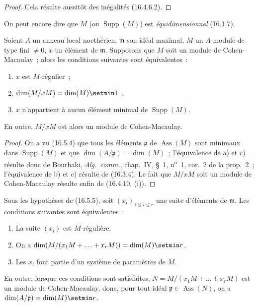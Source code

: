 \begin{proof}
Cela résulte aussitôt des inégalités (16.4.6.2).
\end{proof}

On peut encore dire que $M$ (ou $\operatorname{Supp}(M)$) est
\emph{équidimensionnel} (16.1.7).


\begin{proposition}[16.5.5]
\label{0.16.5.5-fr}
Soient $A$ un anneau local noethérien, $\mathfrak{m}$ son idéal maximal, $M$
un $A$-module de type fini $\neq0$, $x$ un élément de $\mathfrak{m}$.
Supposons que $M$ soit un module de Cohen-Macaulay~; alors les conditions
suivantes sont équivalentes~:
\begin{enumerate}
  \item[\textup{a)}] $x$ est $M$-régulier~;
  \item[\textup{b)}] $\dim(M/xM)=\dim(M)\setmin 1$~;
  \item[\textup{c)}] $x$ n'appartient à aucun élément minimal de
  $\operatorname{Supp}(M)$.
\end{enumerate}
En outre, $M/xM$ est alors un module de Cohen-Macaulay.
\end{proposition}

\begin{proof}
On a vu (16.5.4) que tous les éléments $\mathfrak{p}$ de
$\operatorname{Ass}(M)$ sont minimaux dans $\operatorname{Supp}(M)$ et que
$\dim(A/\mathfrak{p})=\dim(M)$~; l'équivalence de a) et c) résulte donc de
Bourbaki, \emph{Alg.~comm.}, chap.~IV, \S~1, n\textsuperscript{o}~1, cor.~2 de la prop.~2~;
l'équivalence de b) et c) résulte de (16.3.4). Le fait que $M/xM$ soit un
module de Cohen-Macaulay résulte enfin de (16.4.10, (i)).
\end{proof}

\begin{corollary}[16.5.6]
\label{0.16.5.6-fr}
Sous les hypothèses de \textup{(16.5.5)}, soit $(x_i)_{1\leq i\leq r}$ une suite
d'éléments de $\mathfrak{m}$. Les conditions suivantes sont équivalentes~:
\begin{enumerate}
  \item[\textup{a)}] La suite $(x_i)$ est $M$-régulière.
  \item[\textup{b)}] On a
  $\dim(M/(x_1M+\ldots+x_rM))=\dim(M)\setmin r$.
  \item[\textup{c)}] Les $x_i$ font partie d'un système de paramètres de $M$.
\end{enumerate}
En outre, lorsque ces conditions sont satisfaites,
$N=M/(x_1M+\ldots+x_rM)$ est un module de Cohen-Macaulay, donc, pour tout
idéal $\mathfrak{p}\in\operatorname{Ass}(N)$, on a
$\dim(A/\mathfrak{p})=\dim(M)\setmin r$.
\end{corollary}


